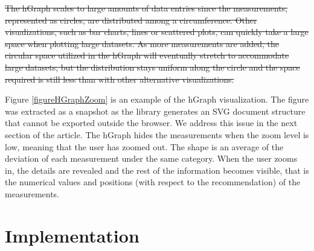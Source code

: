 \documentclass[twocolumn]{bmcart}%
\providecommand{\DIFdel}[1]{{\protect\color{red}\sout{#1}}}                      %
\providecommand{\DIFdelbegin}{} %
\providecommand{\DIFdelend}{} %
\begin{document}


\DIFdelbegin \DIFdel{The hGraph scales to large amounts of data entries since the measurements, represented as circles, are distributed among a circumference. Other visualizations, such as bar charts, lines or scattered plots, can quickly take a large space when plotting large datasets. As more measurements are added, the circular space utilized in the hGraph will eventually stretch to accommodate large datasets, but the distribution stays uniform along the circle and the space required is still less than with other alternative visualizations.
}\DIFdelend %

Figure \ref{figureHGraphZoom} is an example of the hGraph visualization. The figure was extracted as a snapshot as the library generates an SVG document structure that cannot be exported outside the browser. We address this issue in the next section of the article. The hGraph hides the measurements when the zoom level is low, meaning that the user has zoomed out. The shape is an average of the deviation of each measurement under the same category. When the user zooms in, the details are revealed and the rest of the information becomes visible, that is the numerical values and positions (with respect to the recommendation) of the measurements.

\section*{Implementation} 
\end{document}
